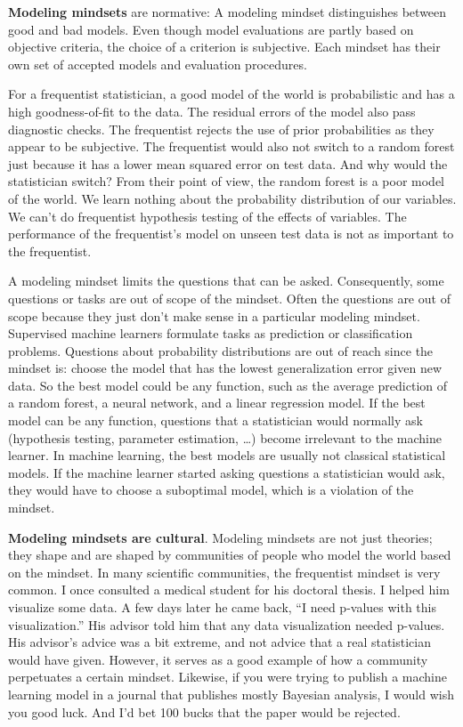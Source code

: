 \documentclass[
  10pt,
]{scrbook}
\begin{document}
\textbf{Modeling mindsets} are normative:
A modeling mindset distinguishes between good and bad models.
Even though model evaluations are partly based on objective criteria, the choice of a criterion is subjective.
Each mindset has their own set of accepted models and evaluation procedures.

For a frequentist statistician, a good model of the world is probabilistic and has a high goodness-of-fit to the data.
The residual errors of the model also pass diagnostic checks.
The frequentist rejects the use of prior probabilities as they appear to be subjective.
The frequentist would also not switch to a random forest just because it has a lower mean squared error on test data.
And why would the statistician switch?
From their point of view, the random forest is a poor model of the world.
We learn nothing about the probability distribution of our variables.
We can't do frequentist hypothesis testing of the effects of variables.
The performance of the frequentist's model on unseen test data is not as important to the frequentist.

A modeling mindset limits the questions that can be asked.
Consequently, some questions or tasks are out of scope of the mindset.
Often the questions are out of scope because they just don't make sense in a particular modeling mindset.
Supervised machine learners formulate tasks as prediction or classification problems.
Questions about probability distributions are out of reach since the mindset is: choose the model that has the lowest generalization error given new data.
So the best model could be any function, such as the average prediction of a random forest, a neural network, and a linear regression model.
If the best model can be any function, questions that a statistician would normally ask (hypothesis testing, parameter estimation, \ldots) become irrelevant to the machine learner.
In machine learning, the best models are usually not classical statistical models.
If the machine learner started asking questions a statistician would ask, they would have to choose a suboptimal model, which is a violation of the mindset.

\textbf{Modeling mindsets are cultural}.
Modeling mindsets are not just theories; they shape and are shaped by communities of people who model the world based on the mindset.
In many scientific communities, the frequentist mindset is very common.
I once consulted a medical student for his doctoral thesis.
I helped him visualize some data.
A few days later he came back, ``I need p-values with this visualization.''
His advisor told him that any data visualization needed p-values.
His advisor's advice was a bit extreme, and not advice that a real statistician would have given.
However, it serves as a good example of how a community perpetuates a certain mindset.
Likewise, if you were trying to publish a machine learning model in a journal that publishes mostly Bayesian analysis, I would wish you good luck.
And I'd bet 100 bucks that the paper would be rejected.
\end{document}
